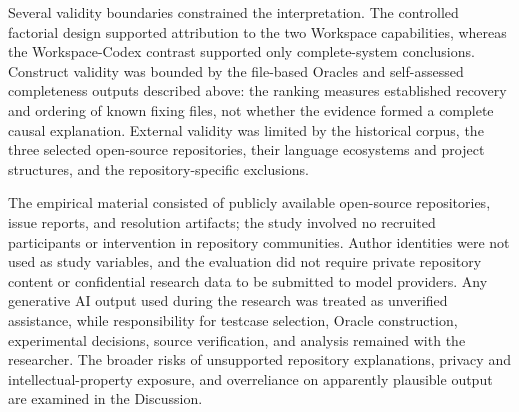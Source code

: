 Several validity boundaries constrained the interpretation. The controlled factorial design supported attribution to the two Workspace capabilities, whereas the Workspace-Codex contrast supported only complete-system conclusions. Construct validity was bounded by the file-based Oracles and self-assessed completeness outputs described above: the ranking measures established recovery and ordering of known fixing files, not whether the evidence formed a complete causal explanation. External validity was limited by the historical corpus, the three selected open-source repositories, their language ecosystems and project structures, and the repository-specific exclusions.

The empirical material consisted of publicly available open-source repositories, issue reports, and resolution artifacts; the study involved no recruited participants or intervention in repository communities. Author identities were not used as study variables, and the evaluation did not require private repository content or confidential research data to be submitted to model providers. Any generative AI output used during the research was treated as unverified assistance, while responsibility for testcase selection, Oracle construction, experimental decisions, source verification, and analysis remained with the researcher. The broader risks of unsupported repository explanations, privacy and intellectual-property exposure, and overreliance on apparently plausible output are examined in the Discussion.
